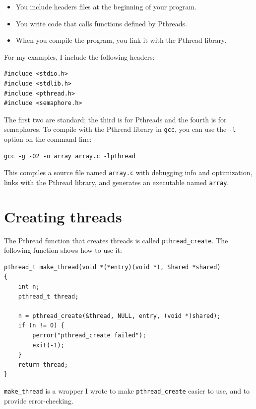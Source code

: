 \documentclass[12pt]{book}
\begin{document}
{\begin{itemize}
\item You include headers files at the beginning of your
program.

\item You write code that calls functions defined by Pthreads.

\item When you compile the program, you link it with the Pthread library.

\end{itemize}

For my examples, I include the following headers:

\begin{verbatim}
#include <stdio.h>
#include <stdlib.h>
#include <pthread.h>
#include <semaphore.h>
\end{verbatim}

The first two are standard; the third is for Pthreads and
the fourth is for semaphores.  To compile with the Pthread library in {\tt gcc}, you can use the {\tt -l} option on the command line:

\begin{verbatim}
gcc -g -O2 -o array array.c -lpthread
\end{verbatim}

This compiles a source file named {\tt array.c} with debugging info
and optimization, links with the Pthread library, and generates an
executable named {\tt array}.


\section{Creating threads}

The Pthread function that creates threads is called \verb"pthread_create".
The following function shows how to use it:

\begin{verbatim}
pthread_t make_thread(void *(*entry)(void *), Shared *shared)
{
    int n;
    pthread_t thread;

    n = pthread_create(&thread, NULL, entry, (void *)shared);
    if (n != 0) {
        perror("pthread_create failed");
        exit(-1);
    }
    return thread;
}
\end{verbatim}

\verb"make_thread" is a wrapper I wrote to make
\verb"pthread_create" easier to use, and to provide error-checking.


}
\end{document}
